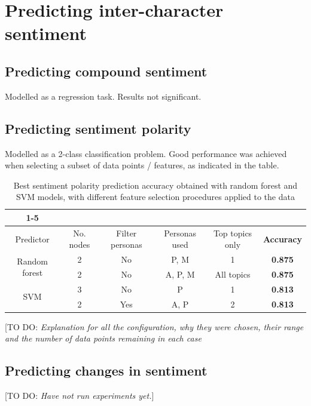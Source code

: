 \documentclass[bsc,frontabs,singlespacing,parskip]{infthesis} %
\begin{document}
\section{Predicting inter-character sentiment}

\subsection{Predicting compound sentiment}
Modelled as a regression task. Results not significant.

\subsection{Predicting sentiment polarity}
Modelled as a 2-class classification problem. Good performance was achieved when selecting a subset of data points / features, as indicated in the table.

\begin{table}[hbf!]
\begin{tabular}{ |c|c|c|c|c|c| }
\cline{1-5}
\multicolumn{5}{ |c| }{Configuration}\\
\hline
Predictor & No. nodes & Filter personas & Personas used & Top topics only & \textbf{Accuracy}\\ \hline
\multirow{2}{*}{Random forest} 
 & 2 & No & P, M & 1 & \textbf{0.875}\\
 & 2 & No & A, P, M & All topics & \textbf{0.875}\\ \hline
\multirow{2}{*}{SVM}
 & 3 & No & P & 1 & \textbf{0.813}\\ 
 & 2 & Yes & A, P & 2 & \textbf{0.813}\\ \hline
\end{tabular}

\caption{Best sentiment polarity prediction accuracy obtained with random forest and SVM models, with different feature selection procedures applied to the data}

\end{table}

[TO DO: \textit{Explanation for all the configuration, why they were chosen, their range and the number of data points remaining in each case}

\subsection{Predicting changes in sentiment}
[TO DO: \textit{Have not run experiments yet.}]



\end{document}
